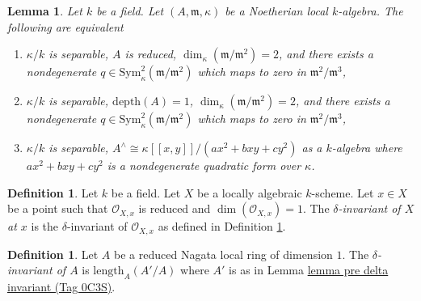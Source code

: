 \documentclass{amsart}
\theoremstyle{plain}
\newtheorem{lemma}[subsection]{Lemma}
\theoremstyle{definition}
\newtheorem{definition}[subsection]{Definition}
\theoremstyle{remark}
\numberwithin{equation}{subsection}
\begin{document}
\begin{lemma}
\label{lemma-nodal-algebraic}
Let $k$ be a field. Let $(A, \mathfrak m, \kappa)$ be a Noetherian
local $k$-algebra. The following are equivalent
\begin{enumerate}
\item $\kappa/k$ is separable, $A$ is reduced,
$\dim_\kappa(\mathfrak m/\mathfrak m^2) = 2$, and there exists a nondegenerate
$q \in \text{Sym}^2_\kappa(\mathfrak m/\mathfrak m^2)$
which maps to zero in $\mathfrak m^2/\mathfrak m^3$,
\item $\kappa/k$ is separable, $\text{depth}(A) = 1$,
$\dim_\kappa(\mathfrak m/\mathfrak m^2) = 2$, and there exists a nondegenerate
$q \in \text{Sym}^2_\kappa(\mathfrak m/\mathfrak m^2)$
which maps to zero in $\mathfrak m^2/\mathfrak m^3$,
\item $\kappa/k$ is separable,
$A^\wedge \cong \kappa[[x, y]]/(ax^2 + bxy + cy^2)$
as a $k$-algebra where $ax^2 + bxy + cy^2$ is a nondegenerate quadratic form
over $\kappa$.
\end{enumerate}
\end{lemma}

\begin{definition}
\label{varieties-definition-delta-invariant}
Let $k$ be a field. Let $X$ be a locally algebraic $k$-scheme.
Let $x \in X$ be a point such that $\mathcal{O}_{X, x}$
is reduced and $\dim(\mathcal{O}_{X, x}) = 1$.
The {\it $\delta$-invariant of $X$ at $x$} is the
$\delta$-invariant of $\mathcal{O}_{X, x}$ as defined in
Definition \ref{varieties-definition-delta-invariant-algebra}.
\end{definition}

\begin{definition}
\label{varieties-definition-delta-invariant-algebra}
Let $A$ be a reduced Nagata local ring of dimension $1$.
The {\it $\delta$-invariant of $A$} is $\text{length}_A(A'/A)$
where $A'$ is as in Lemma \href{https://stacks.math.columbia.edu/tag/0C3S}{lemma pre delta invariant (Tag 0C3S)}.
\end{definition}
\end{document}
